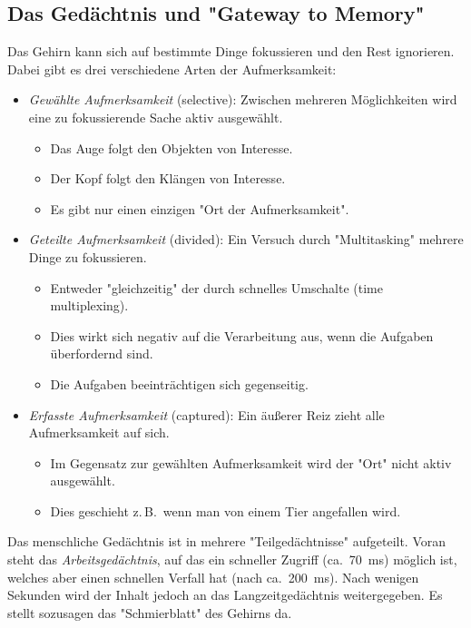 \documentclass[a4paper, 11pt, accentcolor = tud3b]{tudreport}
\newcommand{\ca}{ca.~}
\newcommand{\zB}{z.\,B.~}
\begin{document}
			\subsection{Das Gedächtnis und "Gateway to Memory"}
				Das Gehirn kann sich auf bestimmte Dinge fokussieren und den Rest ignorieren. Dabei gibt es drei verschiedene Arten der Aufmerksamkeit:
				\begin{itemize}
					\item \emph{Gewählte Aufmerksamkeit} (selective): Zwischen mehreren Möglichkeiten wird eine zu fokussierende Sache aktiv ausgewählt.
						\begin{itemize}
							\item Das Auge folgt den Objekten von Interesse.
							\item Der Kopf folgt den Klängen von Interesse.
							\item Es gibt nur einen einzigen "Ort der Aufmerksamkeit".
						\end{itemize}
					\item \emph{Geteilte Aufmerksamkeit} (divided): Ein Versuch durch "Multitasking" mehrere Dinge zu fokussieren.
						\begin{itemize}
							\item Entweder "gleichzeitig" der durch schnelles Umschalte (time multiplexing).
							\item Dies wirkt sich negativ auf die Verarbeitung aus, wenn die Aufgaben überfordernd sind.
							\item Die Aufgaben beeinträchtigen sich gegenseitig.
						\end{itemize}
					\item \emph{Erfasste Aufmerksamkeit} (captured): Ein äußerer Reiz zieht alle Aufmerksamkeit auf sich.
						\begin{itemize}
							\item Im Gegensatz zur gewählten Aufmerksamkeit wird der "Ort" nicht aktiv ausgewählt.
							\item Dies geschieht \zB wenn man von einem Tier angefallen wird.
						\end{itemize}
				\end{itemize}
			
				Das menschliche Gedächtnis ist in mehrere "Teilgedächtnisse" aufgeteilt. Voran steht das \emph{Arbeitsgedächtnis}, auf das ein schneller Zugriff (\ca \SI{70}{\milli\second}) möglich ist, welches aber einen schnellen Verfall hat (nach \ca \SI{200}{\milli\second}). Nach wenigen Sekunden wird der Inhalt jedoch an das Langzeitgedächtnis weitergegeben. Es stellt sozusagen das "Schmierblatt" des Gehirns da.
				
\end{document}
